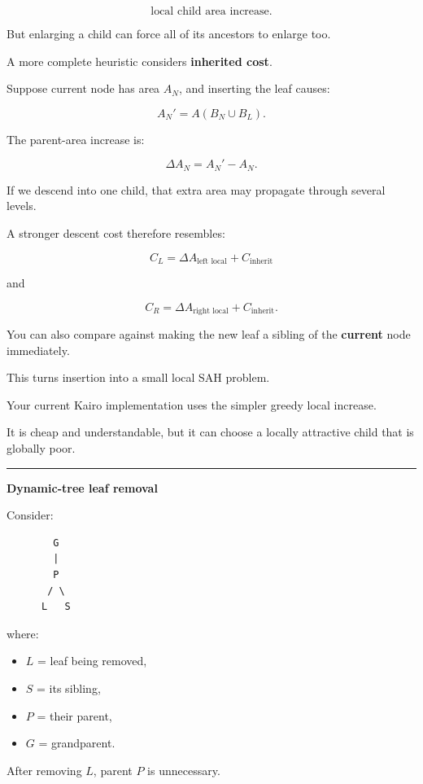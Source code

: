 \[
\text{local child area increase}.
\]

But enlarging a child can force all of its ancestors to enlarge too.

A more complete heuristic considers \textbf{inherited cost}.

Suppose current node has area \(A_N\), and inserting the leaf causes:

\[
A_N'
=
A(B_N\cup B_L).
\]

The parent-area increase is:

\[
\Delta A_N=A_N'-A_N.
\]

If we descend into one child, that extra area may propagate through several levels.

A stronger descent cost therefore resembles:

\[
C_L
=
\Delta A_{\text{left local}}
+
C_{\text{inherit}}
\]

and

\[
C_R
=
\Delta A_{\text{right local}}
+
C_{\text{inherit}}.
\]

You can also compare against making the new leaf a sibling of the \textbf{current} node immediately.

This turns insertion into a small local SAH problem.

Your current Kairo implementation uses the simpler greedy local increase.

It is cheap and understandable, but it can choose a locally attractive child that is globally poor.

\begin{center}\rule{0.5\linewidth}{0.5pt}\end{center}

\textbf{Dynamic-tree leaf removal}

Consider:

\begin{verbatim}
        G
        |
        P
       / \
      L   S
\end{verbatim}

where:

\begin{itemize}
\tightlist
\item
  \(L\) = leaf being removed,
\item
  \(S\) = its sibling,
\item
  \(P\) = their parent,
\item
  \(G\) = grandparent.
\end{itemize}

After removing \(L\), parent \(P\) is unnecessary.

